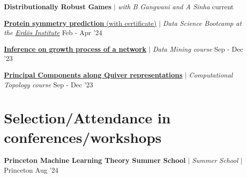 \resumeProjectHeading
{\textbf{Distributionally Robust Games} $|$ \textit{\color{gray}with B Gangwani and A Sinha}}
{current}
{}
\vspace{\mygap}

\resumeProjectHeading
{\href{https://www.erdosinstitute.org/certificates/spring-2024/data-science-boot-camp/nilava-metya}{\textbf{Protein symmetry prediction} (with certificate)} $|$ \textit{\color{gray}Data Science Bootcamp at the \href{https://www.erdosinstitute.org}{Erd\"os Institute}}}
{Feb - Apr '24}
{}
\vspace{\mygap}


\resumeProjectHeading
{\href{https://youtu.be/l2dJ6WUBLzs}
{\textbf{Inference on growth process of a network}} $|$ \textit{\color{gray}Data Mining course}}
{Sep - Dec '23}
{}
\vspace{\mygap}

\resumeProjectHeading
{\href{https://nilavam.github.io/TDA_quiver.pdf}{\textbf{Principal Components along Quiver representations}} $|$ \textit{\color{gray}Computational Topology course}}
{Sep - Dec '23}
{}
\vspace{\gap}



\resumeSubHeadingListEnd

\section{Selection/Attendance in conferences/workshops}
\resumeSubHeadingListStart


\resumeProjectHeading
{\textbf{Princeton Machine Learning Theory Summer School} $|$ \textit{\color{gray}Summer School} $|$ Princeton}
{Aug '24}
{}
\vspace{\mygap}



